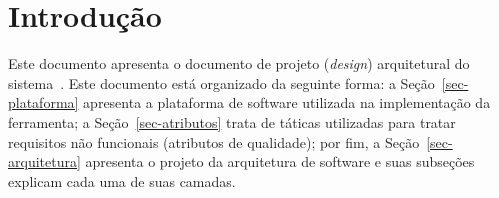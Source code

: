 \chapter{Introdução}
\label{sec-intro}

Este documento apresenta o documento de projeto (\textit{design}) arquitetural do sistema~\imprimirtitulo. Este documento está organizado da seguinte forma: a Seção~\ref{sec-plataforma} apresenta a plataforma de software utilizada na implementação da ferramenta; a Seção~\ref{sec-atributos} trata de táticas utilizadas para tratar requisitos não funcionais (atributos de qualidade); por fim, a Seção~\ref{sec-arquitetura} apresenta o projeto da arquitetura de software e suas subseções explicam cada uma de suas camadas.
